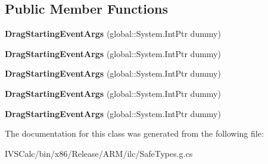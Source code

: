 \subsection*{Public Member Functions}
\begin{DoxyCompactItemize}
\item 
\mbox{\label{class_windows_1_1_u_i_1_1_xaml_1_1_drag_starting_event_args_a7eb5adfcd7934ec30239508b0daeffdc}} 
{\bfseries Drag\+Starting\+Event\+Args} (global\+::\+System.\+Int\+Ptr dummy)
\item 
\mbox{\label{class_windows_1_1_u_i_1_1_xaml_1_1_drag_starting_event_args_a7eb5adfcd7934ec30239508b0daeffdc}} 
{\bfseries Drag\+Starting\+Event\+Args} (global\+::\+System.\+Int\+Ptr dummy)
\item 
\mbox{\label{class_windows_1_1_u_i_1_1_xaml_1_1_drag_starting_event_args_a7eb5adfcd7934ec30239508b0daeffdc}} 
{\bfseries Drag\+Starting\+Event\+Args} (global\+::\+System.\+Int\+Ptr dummy)
\item 
\mbox{\label{class_windows_1_1_u_i_1_1_xaml_1_1_drag_starting_event_args_a7eb5adfcd7934ec30239508b0daeffdc}} 
{\bfseries Drag\+Starting\+Event\+Args} (global\+::\+System.\+Int\+Ptr dummy)
\item 
\mbox{\label{class_windows_1_1_u_i_1_1_xaml_1_1_drag_starting_event_args_a7eb5adfcd7934ec30239508b0daeffdc}} 
{\bfseries Drag\+Starting\+Event\+Args} (global\+::\+System.\+Int\+Ptr dummy)
\end{DoxyCompactItemize}


The documentation for this class was generated from the following file\+:\begin{DoxyCompactItemize}
\item 
I\+V\+S\+Calc/bin/x86/\+Release/\+A\+R\+M/ilc/Safe\+Types.\+g.\+cs\end{DoxyCompactItemize}

